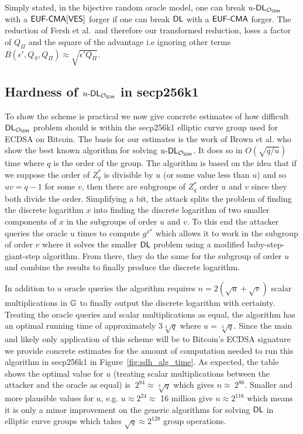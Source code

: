 Simply stated, in the bijective random oracle model, one can break $u\text{-}\textsf{DL}_{\mathcal{O}_{\textsf{SDH}}}$ with a $\textsf{EUF-CMA}[\textsf{VES}]$ forger if one can break $\textsf{DL}$ with a $\textsf{EUF-CMA}$ forger.
The reduction of Fersh et al.\, and therefore our transformed reduction, loses a factor of $Q_{\Pi}$ and the square of the advantage i.e ignoring other terms $B(\epsilon', Q_S, Q_{\Pi}) \approx \sqrt{\epsilon'Q_{\Pi}}$.

\subsection{Hardness of $u\text{-}\textsf{DL}_{\mathcal{O}_{\textsf{SDH}}}$ in secp256k1}

To show the scheme is practical we now give concrete estimates of how difficult $\textsf{DL}_{\mathcal{O}_{\textsf{SDH}}}$ problem should is within the secp256k1 elliptic curve group used for ECDSA on Bitcoin.
The basis for our estimates is the work of Brown et al.\cite{SDHP} who show the best known algorithm for solving $u\text{-}\textsf{DL}_{\mathcal{O}_{\textsf{SDH}}}$.
It does so in $O(\sqrt{q/u})$ time where $q$ is the order of the group.
The algorithm is based on the idea that if we suppose the order of $Z^*_q$ is divisible by $u$ (or some value less than $u$) and so $uv = q-1$ for some $v$, then there are subgroups of $Z^*_q$ order $u$ and $v$ since they both divide the order.
Simplifying a bit, the attack splits the problem of finding the discrete logarithm $x$ into finding the discrete logarithm of two smaller components of $x$ in the subgroups of order $u$ and $v$.
To this end the attacker queries the oracle $u$ times to compute $g^{x^{u}}$ which allows it to work in the subgroup of order $v$ where it solves the smaller $\textsf{DL}$ problem using a modified baby-step-giant-step algorithm.
From there, they do the same for the subgroup of order $u$ and combine the results to finally produce the discrete logarithm.

In addition to $u$ oracle queries the algorithm requires $n = 2(\sqrt{u} + \sqrt{v})$ scalar multiplications in $\mathbb{G}$ to finally output the discrete logarithm with certainty.
Treating the oracle queries and scalar multiplications as equal, the algorithm has an optimal running time of approximately $3\sqrt[3]{q}$ where $u = \sqrt[3]{q}$.
Since the main and likely only application of this scheme will be to Bitcoin's ECDSA signature we provide concrete estimates for the amount of computation needed to run this algorithm in secp256k1 in Figure~\ref{fig:sdh_alg_time}.
As expected, the table shows the optimal value for $u$ (treating scalar multiplications between the attacker and the oracle as equal) is $~2^{84} \approx \sqrt[3]{q}$ which gives $n \approx ~2^{86}$.
Smaller and more plausible values for $u$, e.g. $u \approx 2^{24} \approx$ 16 million give $n \approx 2^{116}$ which means it is only a minor improvement on the generic algorithms for solving $\textsf{DL}$ in elliptic curve groups which takes $\sqrt{q} \approx 2^{128}$ group operations.

